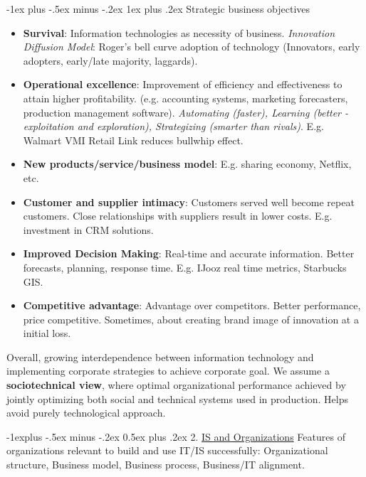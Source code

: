 \documentclass[12pt, landscape]{article}
\makeatletter
\renewcommand{\subsection}{\@startsection{subsection}{2}{0mm}%
                                {-1explus -.5ex minus -.2ex}%
                                {0.5ex plus .2ex}%
                                {\normalfont\normalsize\bfseries}}
\renewcommand{\subsubsection}{\@startsection{subsubsection}{3}{0mm}%
                                {-1ex plus -.5ex minus -.2ex}%
                                {1ex plus .2ex}%
                                {\normalfont\small\bfseries}}
\makeatother
\begin{document}
\begin{multicols*}{3}
\subsubsection{Strategic business objectives}
\begin{itemize}
\item \textbf{Survival}: Information technologies as necessity of business. \textit{Innovation Diffusion Model}: Roger’s bell curve adoption of technology (Innovators, early adopters, early/late majority, laggards).
\item \textbf{Operational excellence}: Improvement of efficiency and effectiveness to attain higher profitability. (e.g. accounting systems, marketing forecasters, production management software). \textit{Automating (faster), Learning (better - exploitation and exploration), Strategizing (smarter than rivals)}. E.g. Walmart VMI Retail Link reduces bullwhip effect.
\item \textbf{New products/service/business model}: E.g. sharing economy, Netflix, etc.
\item \textbf{Customer and supplier intimacy}:  Customers served well become repeat customers. Close relationships with suppliers result in lower costs. E.g. investment in CRM solutions.
\item \textbf{Improved Decision Making}: Real-time and accurate information. Better forecasts, planning, response time. E.g. IJooz real time metrics, Starbucks GIS.
\item \textbf{Competitive advantage}: Advantage over competitors. Better performance, price competitive. Sometimes, about creating brand image of innovation at a initial loss. 
\end{itemize}

Overall, growing interdependence between information technology and implementing corporate strategies to achieve corporate goal. We assume a \textbf{sociotechnical view}, where optimal organizational performance achieved by jointly optimizing both social and 
technical systems used in production. Helps avoid purely technological approach.

\subsection{2. \underline{IS and Organizations}}
Features of organizations relevant to build and use IT/IS successfully: Organizational structure, Business model, Business process, Business/IT alignment.


\end{multicols*}
\end{document}
